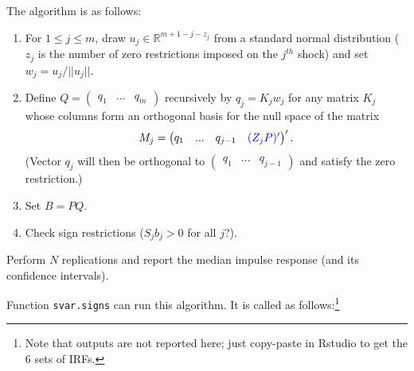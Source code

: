 \documentclass[
  11pt,
]{book}
\providecommand{\tightlist}{%
  \setlength{\itemsep}{0pt}\setlength{\parskip}{0pt}}
\theoremstyle{definition}
\theoremstyle{definition}
\theoremstyle{definition}
\theoremstyle{definition}
\theoremstyle{remark}
\begin{document}
The algorithm is as follows:

\begin{enumerate}
\def\labelenumi{\arabic{enumi}.}
\tightlist
\item
  For \(1\le j\le m\), draw \(u_j\in \mathbb{R}^{m+1-j-z_j}\) from a standard normal distribution (\(z_j\) is the number of zero restrictions imposed on the \(j^{th}\) shock) and set \(w_j = u_j/||u_j||\).
\item
  Define \(Q= \begin{pmatrix}q_1&...&q_m\end{pmatrix}\) recursively by \(q_j = K_jw_j\) for any matrix \(K_j\) whose columns form an orthogonal basis for the null space of the matrix \[M_j =
  \begin{pmatrix} q_1&...&q_{j-1}&{\color{blue}(Z_jP)'}\end{pmatrix}'.\] (Vector \(q_j\) will then be orthogonal to \(\begin{pmatrix} q_1&...&q_{j-1}\end{pmatrix}\) and satisfy the zero restriction.)
\item
  Set \(B=PQ\).
\item
  Check sign restrictions (\(S_jb_j>0\) for all \(j\)?).
\end{enumerate}

Perform \(N\) replications and report the median impulse response (and its confidence intervals).

Function \texttt{svar.signs} can run this algorithm. It is called as follows:\footnote{Note that outputs are not reported here; just copy-paste in Rstudio to get the 6 sets of IRFs.}
\end{document}
